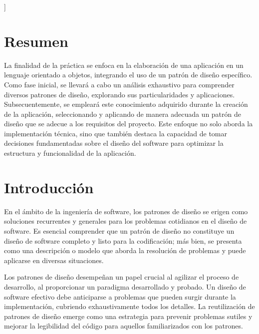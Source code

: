 \documentclass[11pt, twocolumn]{article}
\newcommand{\linejump}{\hfill \break}
\begin{document}
    \linejump
  ]

        
  \fancyfoot{}

  \section*{Resumen}
  La finalidad de la práctica se enfoca en la elaboración de una aplicación en un lenguaje orientado a objetos, integrando el uso de un patrón de diseño específico. Como fase inicial, se llevará a cabo un análisis exhaustivo para comprender diversos patrones de diseño, explorando sus particularidades y aplicaciones. Subsecuentemente, se empleará este conocimiento adquirido durante la creación de la aplicación, seleccionando y aplicando de manera adecuada un patrón de diseño que se adecue a los requisitos del proyecto. Este enfoque no solo aborda la implementación técnica, sino que también destaca la capacidad de tomar decisiones fundamentadas sobre el diseño del software para optimizar la estructura y funcionalidad de la aplicación.

  \section*{Introducción}
  En el ámbito de la ingeniería de software, los patrones de diseño se erigen como soluciones recurrentes y generales para los problemas cotidianos en el diseño de software. Es esencial comprender que un patrón de diseño no constituye un diseño de software completo y listo para la codificación; más bien, se presenta como una descripción o modelo que aborda la resolución de problemas y puede aplicarse en diversas situaciones.

  Los patrones de diseño desempeñan un papel crucial al agilizar el proceso de desarrollo, al proporcionar un paradigma desarrollado y probado. Un diseño de software efectivo debe anticiparse a problemas que pueden surgir durante la implementación, cubriendo exhaustivamente todos los detalles. La reutilización de patrones de diseño emerge como una estrategia para prevenir problemas sutiles y mejorar la legibilidad del código para aquellos familiarizados con los patrones.
\end{document}
